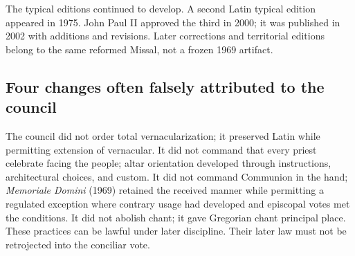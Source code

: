 The typical editions continued to develop. A second Latin typical edition appeared in 1975. John Paul II approved the third in 2000; it was published in 2002 with additions and revisions. Later corrections and territorial editions belong to the same reformed Missal, not a frozen 1969 artifact.

\subsection{Four changes often falsely attributed to the council}

The council did not order total vernacularization; it preserved Latin while permitting extension of vernacular. It did not command that every priest celebrate facing the people; altar orientation developed through instructions, architectural choices, and custom. It did not command Communion in the hand; \emph{Memoriale Domini} (1969) retained the received manner while permitting a regulated exception where contrary usage had developed and episcopal votes met the conditions. It did not abolish chant; it gave Gregorian chant principal place. These practices can be lawful under later discipline. Their later law must not be retrojected into the conciliar vote.

